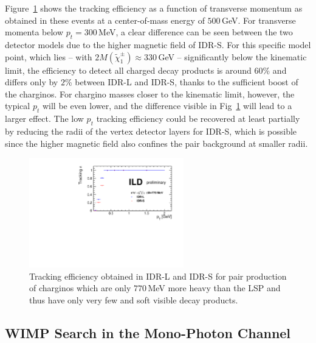 Figure~\ref{fig:higgsino:trkeffi} shows the tracking efficiency as a function of transverse momentum as obtained
in these events at a center-of-mass energy of $500$\,GeV. For transverse
momenta below $p_t = 300$\,MeV, a clear difference can be seen between the two detector models due to the higher magnetic field of IDR-S. For this specific model point, which lies -- with $2 M(\tilde{\chi}^{\pm}_1) \approx 330$\,GeV -- significantly below the kinematic limit, the efficiency to detect all charged decay products is around $60$\% and differs only by $2$\% between IDR-L and IDR-S, thanks to the sufficient boost of the charginos. For chargino masses closer to the kinematic limit, however, the typical $p_t$ will be even lower, 
and the difference visible in Fig~\ref{fig:higgsino:trkeffi} will lead to a larger effect.
The low $p_t$ tracking efficiency could be recovered at least partially by reducing the radii of the vertex detector layers for IDR-S, which is possible since the higher magnetic field also confines the pair background at smaller radii.
\begin{figure}[htbp]
\begin{center}
 \includegraphics[width=0.6\textwidth]{Performance/fig/Tracking_efficiency.pdf}
\end{center}
\caption{Tracking efficiency obtained in IDR-L and IDR-S for pair production of charginos which are only $770$\,MeV more heavy than the LSP and thus have only very few and soft visible decay products.
}
\label{fig:higgsino:trkeffi}
\end{figure}


\subsection{WIMP Search in the Mono-Photon Channel}

